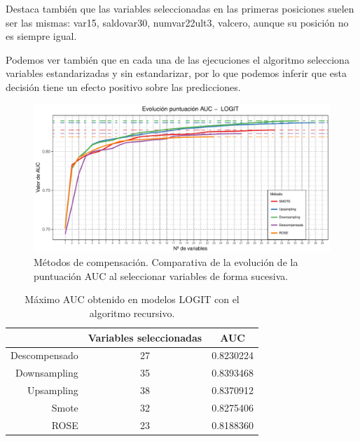\documentclass[11pt,a4paper,spanish]{article} %
\begin{document}
Destaca también que las variables seleccionadas en las primeras posiciones suelen ser las mismas: var15, saldo\textunderscore var30, num\textunderscore var22\textunderscore ult3, val\textunderscore cero, aunque su posición no es siempre igual. 

\newpage 

Podemos ver también que en cada una de las ejecuciones el algoritmo selecciona variables estandarizadas y sin estandarizar, por lo que podemos inferir que esta decisión tiene un efecto positivo sobre las predicciones. 


\begin{figure}[h!]
	\begin{center}
	\includegraphics[width=\textwidth]{Z_02_06_Evolucion_modelos_Logit.pdf}
    \caption{Métodos de compensación. Comparativa de la evolución de la puntuación AUC al seleccionar variables de forma sucesiva.}
    \end{center}
\end{figure}

\begin{table}[!htbp]
\begin{center}
\begin{tabular}{rcc}
  \hline
& Variables seleccionadas & AUC \\ 
  \hline
Descompensado &  27 & 0.8230224 \\ 
Downsampling &  35 & 0.8393468 \\ 
Upsampling &  38 & 0.8370912 \\ 
Smote &  32 & 0.8275406 \\ 
ROSE &  23 & 0.8188360 \\ 
   \hline
\end{tabular}
\end{center}
\caption{Máximo AUC obtenido en modelos LOGIT con el algoritmo recursivo.}
\end{table}
\end{document}
